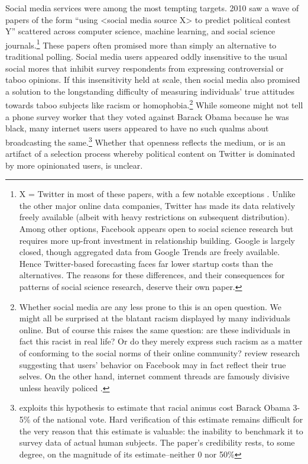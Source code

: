 \documentclass{article}
\begin{document}
Social media services were among the most tempting
targets. 2010 saw a wave of papers of the form ``using
<social media source X> to predict political contest Y'' scattered across computer science, machine learning, and
social science journals.\footnote{X = Twitter in most of these papers, with a few notable
  exceptions \citep{bond201261,broockman2013online}. Unlike the other major online data companies, Twitter has made
  its data relatively freely available (albeit with heavy restrictions
  on subsequent distribution). Among other options, Facebook appears open to
  social science research but requires more up-front investment in
  relationship building. Google is largely closed, though aggregated
  data from Google Trends are freely available. Hence Twitter-based
  forecasting faces far lower startup costs than the alternatives. The reasons for these
  differences, and their consequences for patterns of social science
  research, deserve their own paper.}
These papers often promised more than simply an
alternative to traditional polling. Social media users appeared oddly
insensitive to the usual social mores that inhibit survey respondents from expressing
controversial or taboo opinions. If this insensitivity held at scale, then social
media also promised a solution to the longstanding
difficulty of measuring individuals' true attitudes towards taboo
subjects like racism or homophobia.\footnote{Whether social media are any less prone to this
is an open question. We might all be surprised at the blatant racism
displayed by many individuals online. But of course this raises the
same question: are these individuals in fact this racist in real life?
Or do they merely express such racism as a matter of conforming to the
social norms of their online community? \cite{wilson2012review}
review research suggesting that users' behavior on Facebook may in
fact reflect their true selves. On the other hand, internet comment
threads are famously divisive unless heavily policed \citep{binns2012don}.}  While someone might not tell a phone survey worker that they
voted against Barack Obama because he was black, many internet users
users appeared to have no such qualms about broadcasting the
same.\footnote{\cite{stephens2013cost} exploits this hypothesis to
  estimate that racial animus cost Barack Obama 3-5\% of the national
  vote. Hard verification of this estimate remains difficult for the
  very reason that this estimate is valuable: the inability to
  benchmark it to survey data of actual human subjects. The paper's
  credibility rests, to some degree, on the magnitude of its
  estimate--neither 0 nor 50\%} Whether that openness reflects the
medium, or is an artifact of a selection process whereby political
content on Twitter is dominated by more opinionated users, is unclear.
\end{document}
